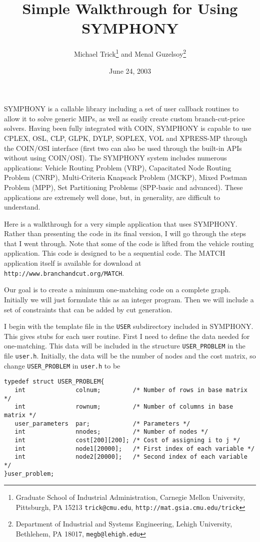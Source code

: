 \documentclass[11pt]{article}
\begin{document}
\title{Simple Walkthrough for Using SYMPHONY} \author{Michael
Trick\thanks{Graduate School of Industrial Administration, Carnegie Mellon
University, Pittsburgh, PA 15213 \texttt{trick@cmu.edu},
\texttt{http://mat.gsia.cmu.edu/trick}} and Menal Guzelsoy\thanks{Department
of Industrial and Systems Engineering, Lehigh University, Bethlehem, PA 18017,
{\tt megb@lehigh.edu}}}

\date{June 24, 2003}
\maketitle
\thispagestyle{empty}

SYMPHONY is a callable library including a set of user callback routines to
allow it to solve generic MIPs, as well as easily create custom
branch-cut-price solvers. Having been fully integrated with COIN, SYMPHONY is
capable to use CPLEX, OSL, CLP, GLPK, DYLP, SOPLEX, VOL and XPRESS-MP through
the COIN/OSI interface (first two can also be used through the built-in APIs
without using COIN/OSI). The SYMPHONY system includes numerous applications:
Vehicle Routing Problem (VRP), Capacitated Node Routing Problem (CNRP),
Multi-Criteria Knapsack Problem (MCKP), Mixed Postman Problem (MPP), Set
Partitioning Problems (SPP-basic and advanced).  These applications are
extremely well done, but, in generality, are difficult to understand.

Here is a walkthrough for a very simple application that uses SYMPHONY. Rather
than presenting the code in its final version, I will go through the steps 
that I went through. Note that some of the code is lifted from the vehicle 
routing application. This code is designed to be a sequential code. The MATCH application itself is available for download at 
\texttt{http://www.branchandcut.org/MATCH}. 

Our goal is to create a minimum one-matching code on a complete graph.
Initially we will just formulate this as an integer program. Then we will
include a set of constraints that can be added by cut generation.

I begin with the template file in the \texttt{USER} subdirectory included in
SYMPHONY. This gives stubs for each user routine. First I need to define the
data needed for one-matching. This data will be included in the structure
\texttt{USER\_PROBLEM} in the file \texttt{user.h}.  Initially, the data will
be the number of nodes and the cost matrix, so change \texttt{USER\_PROBLEM}
in \texttt{user.h} to be
\begin{verbatim}
typedef struct USER_PROBLEM{
   int              colnum;         /* Number of rows in base matrix */
   int              rownum;         /* Number of columns in base matrix */
   user_parameters  par;            /* Parameters */
   int              nnodes;         /* Number of nodes */
   int              cost[200][200]; /* Cost of assigning i to j */ 
   int              node1[20000];   /* First index of each variable */
   int              node2[20000];   /* Second index of each variable */
}user_problem;
\end{verbatim}
\end{document}
